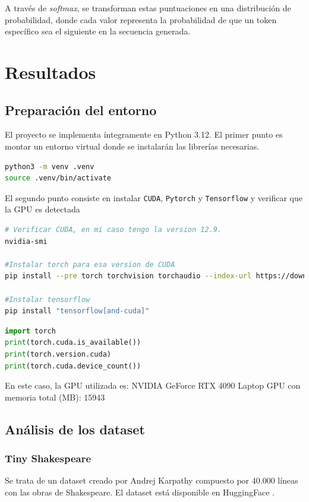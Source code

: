 \documentclass[11pt]{book}
\newcommand{\clearemptydoublepage}{\newpage{\pagestyle{empty}\cleardoublepage}}
\theoremstyle{plain}
\theoremstyle{definition}
\begin{document}
A través de \textit{softmax}, se transforman estas puntuaciones en una distribución de probabilidad, donde cada valor representa la probabilidad de que un token específico sea el siguiente en la secuencia generada. 


\clearemptydoublepage

\chapter{Resultados}
\section{Preparación del entorno}
El proyecto se implementa íntegramente en Python 3.12. 
El primer punto es montar un entorno virtual donde se instalarán las librerías necesarias.

\begin{lstlisting}[language=bash]
python3 -m venv .venv
source .venv/bin/activate
\end{lstlisting}
El segundo punto consiste en instalar \texttt{CUDA}, \texttt{Pytorch} y \texttt{Tensorflow} y verificar que la GPU es detectada
\begin{lstlisting}[language=bash]
# Verificar CUDA, en mi caso tengo la version 12.9.
nvidia-smi

#Instalar torch para esa version de CUDA
pip install --pre torch torchvision torchaudio --index-url https://download.pytorch.org/whl/nightly/cu129

#Instalar tensorflow
pip install "tensorflow[and-cuda]"

\end{lstlisting}

\begin{lstlisting}[language=Python]
import torch
print(torch.cuda.is_available())
print(torch.version.cuda)
print(torch.cuda.device_count())
\end{lstlisting}
En este caso, la GPU utilizada es: NVIDIA GeForce RTX 4090 Laptop GPU con memoria total (MB): 15943

\section{Análisis de los dataset}
\subsection{Tiny Shakespeare}
Se trata de un dataset creado por Andrej Karpathy compuesto por 40.000 líneas con las obras de Shakespeare. El dataset está disponible en HuggingFace \parencite{huggingface_tinyshakespeare}.
\end{document}

